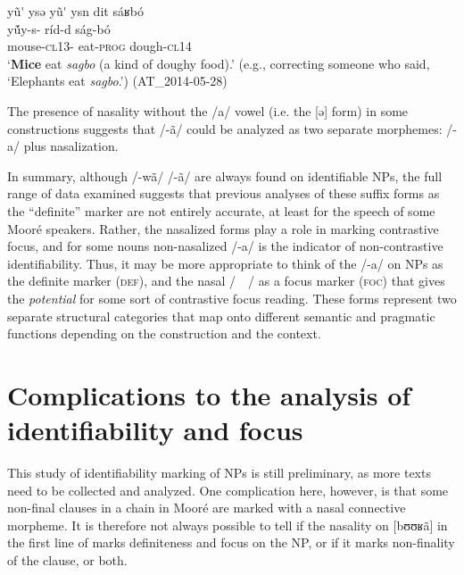 \documentclass[output=paper]{langsci/langscibook}
\begin{document}
\ea\label{ex:teo:56}
yũ\'{} ysə {\Tilde}yũ\'{} ysn dit sáʁbó\\
\gll y\'ũy-s-{\Tilde}  ríd-d{\rmfnm} ság-bó\\
mouse-\textsc{cl13-{\Tilde}} eat-\textsc{prog} dough-\textsc{cl14}\\
\glt ‘\textbf{Mice} eat \textit{sagbo} (a kind of doughy food).’ (e.g., correcting someone who said, ‘Elephants eat \textit{sagbo}.’) (AT\_2014-05-28)
\z
{}

The presence of nasality without the /a/ vowel (i.e. the [ə] form) in some constructions suggests that /-ã/ could be analyzed as two separate morphemes: /-a/ plus nasalization.


In summary, although /-wã/ {\Tilde} /-ã/ are always found on identifiable NPs, the full range of data examined suggests that previous analyses of these suffix forms as the “definite” marker are not entirely accurate, at least for the speech of some Mooré speakers. Rather, the nasalized forms play a role in marking contrastive focus, and for some nouns non-nasalized /-a/ is the indicator of non-contrastive identifiability. Thus, it may be more appropriate to think of the /-a/ on NPs as the definite marker (\textsc{def}), and the nasal /~{\Tilde}~/ as a focus marker (\textsc{foc}) that gives the \textit{potential} for some sort of contrastive focus reading. These forms represent two separate structural categories that map onto different semantic and pragmatic functions depending on the construction and the context.


\section{Complications to the analysis of identifiability and focus}\label{sec:teo:7}

This study of identifiability marking of NPs is still preliminary, as more texts need to be collected and analyzed. One complication here, however, is that some non-final clauses in a chain in Mooré are marked with a nasal connective morpheme. It is therefore not always possible to tell if the nasality on [bʊʊʁã] in the first line of  marks definiteness and focus on the NP, or if it marks non-finality of the clause, or both.
\end{document}
